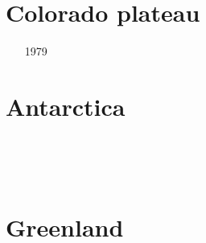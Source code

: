 \section{Colorado plateau}

\begin{scriptsize}
\begin{itemize}
\item[1979]
\item[\twothousandten]
\item[\twothousandeleven]
\end{itemize}
\end{scriptsize}

\section{Antarctica}

\begin{scriptsize}
\begin{itemize}
\item[\nineteenninetyeight]
\item[\twothousandseven]
\item[\twothousandten]
\item[\twothousandtwelve]
 \\ 
\item[\twothousandthirteen]
 \\
\item[\twothousandfifteen]
\item[\twothousandeighteen]
\item[\twothousandtwentyone]
\end{itemize}
\end{scriptsize}

\section{Greenland}

